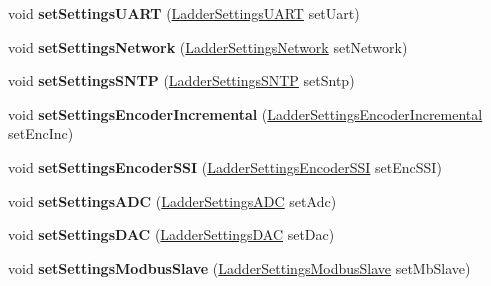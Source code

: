 \begin{DoxyCompactItemize}
\item 
\hypertarget{class_ladder_diagram_ad57d4f952b739f464e385d9d15626879}{void {\bfseries set\-Settings\-U\-A\-R\-T} (\hyperlink{struct_ladder_settings_u_a_r_t}{Ladder\-Settings\-U\-A\-R\-T} set\-Uart)}\label{class_ladder_diagram_ad57d4f952b739f464e385d9d15626879}

\item 
\hypertarget{class_ladder_diagram_ab3cd934aa0e60b1965416c2a69de1ab6}{void {\bfseries set\-Settings\-Network} (\hyperlink{struct_ladder_settings_network}{Ladder\-Settings\-Network} set\-Network)}\label{class_ladder_diagram_ab3cd934aa0e60b1965416c2a69de1ab6}

\item 
\hypertarget{class_ladder_diagram_a4182e651657ea004301504c968b15bbd}{void {\bfseries set\-Settings\-S\-N\-T\-P} (\hyperlink{struct_ladder_settings_s_n_t_p}{Ladder\-Settings\-S\-N\-T\-P} set\-Sntp)}\label{class_ladder_diagram_a4182e651657ea004301504c968b15bbd}

\item 
\hypertarget{class_ladder_diagram_a425833b3baa0a1f6a95052f846bb1612}{void {\bfseries set\-Settings\-Encoder\-Incremental} (\hyperlink{struct_ladder_settings_encoder_incremental}{Ladder\-Settings\-Encoder\-Incremental} set\-Enc\-Inc)}\label{class_ladder_diagram_a425833b3baa0a1f6a95052f846bb1612}

\item 
\hypertarget{class_ladder_diagram_af8f972b38e5cb97658506ffc45e2f6cd}{void {\bfseries set\-Settings\-Encoder\-S\-S\-I} (\hyperlink{struct_ladder_settings_encoder_s_s_i}{Ladder\-Settings\-Encoder\-S\-S\-I} set\-Enc\-S\-S\-I)}\label{class_ladder_diagram_af8f972b38e5cb97658506ffc45e2f6cd}

\item 
\hypertarget{class_ladder_diagram_a566adb68bc738725ce13052f1497ae9c}{void {\bfseries set\-Settings\-A\-D\-C} (\hyperlink{struct_ladder_settings_a_d_c}{Ladder\-Settings\-A\-D\-C} set\-Adc)}\label{class_ladder_diagram_a566adb68bc738725ce13052f1497ae9c}

\item 
\hypertarget{class_ladder_diagram_af101279009599d71803a2811571b3306}{void {\bfseries set\-Settings\-D\-A\-C} (\hyperlink{struct_ladder_settings_d_a_c}{Ladder\-Settings\-D\-A\-C} set\-Dac)}\label{class_ladder_diagram_af101279009599d71803a2811571b3306}

\item 
\hypertarget{class_ladder_diagram_ac422f4a2ad30ad198651fe195145b859}{void {\bfseries set\-Settings\-Modbus\-Slave} (\hyperlink{struct_ladder_settings_modbus_slave}{Ladder\-Settings\-Modbus\-Slave} set\-Mb\-Slave)}\label{class_ladder_diagram_ac422f4a2ad30ad198651fe195145b859}


\end{DoxyCompactItemize}

